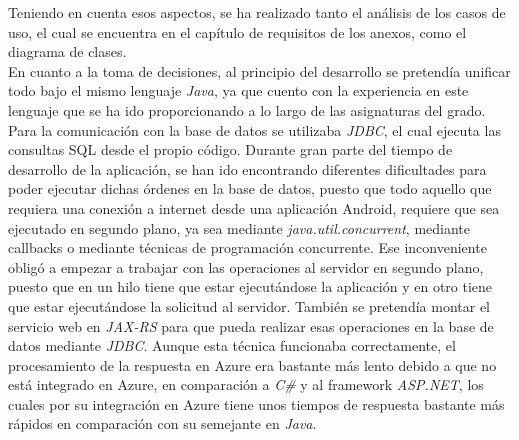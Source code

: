 Teniendo en cuenta esos aspectos, se ha realizado tanto el análisis de los casos
de uso, el cual se encuentra en el capítulo de requisitos de los anexos, como el
diagrama de clases.
\\
En cuanto a la toma de decisiones, al principio del desarrollo se pretendía
unificar todo bajo el mismo lenguaje \textit{Java}, ya que cuento con la
experiencia en este lenguaje que se ha ido proporcionando a lo largo de las
asignaturas del grado. Para la comunicación con la base de datos se utilizaba
\textit{JDBC}, el cual ejecuta las consultas SQL desde el propio código. Durante
gran parte del tiempo de desarrollo de la aplicación, se han ido encontrando
diferentes dificultades para poder ejecutar dichas órdenes en la base de datos,
puesto que todo aquello que requiera una conexión a internet desde una
aplicación Android, requiere que sea ejecutado en segundo plano, ya sea mediante
\textit{java.util.concurrent}, mediante callbacks o mediante técnicas de programación
concurrente. Ese inconveniente obligó a empezar a trabajar con las operaciones
al servidor en segundo plano, puesto que en un hilo tiene que estar ejecutándose
la aplicación y en otro tiene que estar ejecutándose la solicitud al servidor.
También se pretendía montar el servicio web en \textit{JAX-RS} para que pueda
realizar esas operaciones en la base de datos mediante \textit{JDBC}. Aunque
esta técnica funcionaba correctamente, el procesamiento de la respuesta en Azure
era bastante más lento debido a que no está integrado en Azure, en comparación a
\textit{C\#} y al framework \textit{ASP.NET}, los cuales por su integración en
Azure tiene unos tiempos de respuesta bastante más rápidos en comparación con su
semejante en \textit{Java}.


